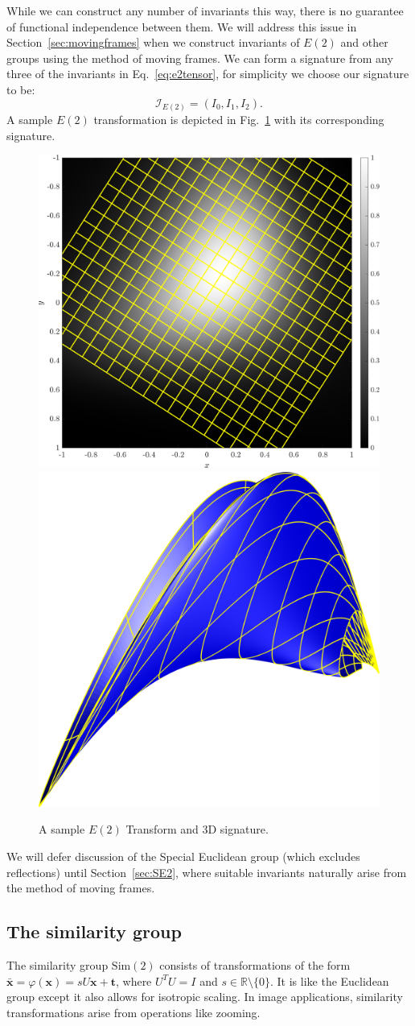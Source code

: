 \documentclass{artjlt}
\begin{document}
While we can construct any number of invariants this way, there is no
guarantee of functional independence between them. We will address this
issue in Section~\ref{sec:movingframes} when we construct invariants of
$E(2)$ and other groups using the method of moving frames. We can form a
signature from any three of the invariants in Eq.~\eqref{eq:e2tensor}, for simplicity we choose 
our signature to be:
\begin{equation}
    \label{eq:e2signature}
    \mathcal{I}_{E(2)} = (I_0, I_1, I_2) .
\end{equation}  
A sample $E(2)$ transformation is depicted in Fig.~\ref{fig:E2} with its corresponding
signature.
\begin{figure}
\centering
\includegraphics[width=.45\textwidth]{Figs/f_transformed_E2.png}
\includegraphics[width=.45\textwidth]{Figs/E2_signature.png}
\caption{A sample $E(2)$ Transform and 3D signature.}
\label{fig:E2}
\end{figure}
We will defer discussion of the Special Euclidean group (which excludes
reflections) until Section~\ref{sec:SE2}, where suitable invariants naturally arise
from the method of moving frames.

\subsection{The similarity group}
\label{sec:Sim2}
The similarity group $\text{Sim}(2)$ consists of transformations of the form
$\bar{\mathbf{x}} = \varphi(\mathbf{x}) = sU\mathbf{x} + \mathbf{t}$, where $U^TU = I$ and $s
\in \mathbb{R}\setminus\{0\}$. It is like the Euclidean group except it
also allows for isotropic scaling. In image applications, similarity
transformations arise from operations like zooming.
\end{document}
